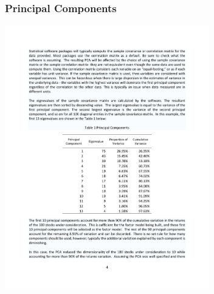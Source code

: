 \documentclass[xcolor=pdftex,dvipsnames,table,mathserif,aspectratio=169]{beamer}
\begin{document}
\begin{frame}
\frametitle{Principal Components}
\begin{center}
\includegraphics[width=3.5in]{./resources/princomp2}
\end{center}
\end{frame}
\end{document}
